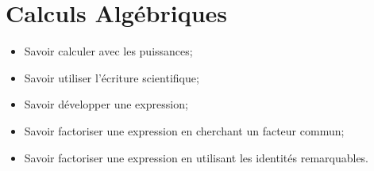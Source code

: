 \chapter{Calculs Algébriques}\label{ChCalAlgebriques}




%

\begin{acquis}
\begin{itemize}
\item Savoir calculer avec les puissances;
\item Savoir utiliser l'écriture scientifique;
\item Savoir développer une expression;\\
\item Savoir factoriser une expression en cherchant un facteur commun;
\item Savoir factoriser une expression en utilisant les identités remarquables.
\end{itemize}
\end{acquis}

%

\exercicesbase
\begin{colonne*exercice}

\end{colonne*exercice}






%

\pagebreak

%


